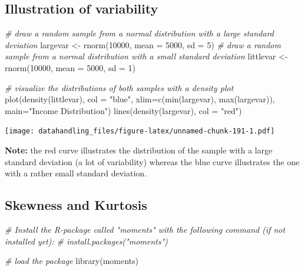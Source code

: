 \documentclass[
  12pt,
]{style/krantz}
\newenvironment{Shaded}{\begin{snugshade}}{\end{snugshade}}
\newcommand{\AttributeTok}[1]{\textcolor[rgb]{0.77,0.63,0.00}{#1}}
\newcommand{\CommentTok}[1]{\textcolor[rgb]{0.56,0.35,0.01}{\textit{#1}}}
\newcommand{\DecValTok}[1]{\textcolor[rgb]{0.00,0.00,0.81}{#1}}
\newcommand{\FunctionTok}[1]{\textcolor[rgb]{0.00,0.00,0.00}{#1}}
\newcommand{\NormalTok}[1]{#1}
\newcommand{\OtherTok}[1]{\textcolor[rgb]{0.56,0.35,0.01}{#1}}
\newcommand{\StringTok}[1]{\textcolor[rgb]{0.31,0.60,0.02}{#1}}
\begin{document}
\hypertarget{illustration-of-variability}{%
\subsection{Illustration of variability}\label{illustration-of-variability}}

\begin{Shaded}
\begin{Highlighting}[]
\CommentTok{\# draw a random sample from a normal distribution with a large standard deviation}
\NormalTok{largevar }\OtherTok{\textless{}{-}} \FunctionTok{rnorm}\NormalTok{(}\DecValTok{10000}\NormalTok{, }\AttributeTok{mean =} \DecValTok{5000}\NormalTok{, }\AttributeTok{sd =} \DecValTok{5}\NormalTok{)}
\CommentTok{\# draw a random sample from a normal distribution with a small standard deviation}
\NormalTok{littlevar }\OtherTok{\textless{}{-}} \FunctionTok{rnorm}\NormalTok{(}\DecValTok{10000}\NormalTok{, }\AttributeTok{mean =} \DecValTok{5000}\NormalTok{, }\AttributeTok{sd =} \DecValTok{1}\NormalTok{)}

\CommentTok{\# visualize the distributions of both samples with a density plot}
\FunctionTok{plot}\NormalTok{(}\FunctionTok{density}\NormalTok{(littlevar), }\AttributeTok{col =} \StringTok{"blue"}\NormalTok{, }
     \AttributeTok{xlim=}\FunctionTok{c}\NormalTok{(}\FunctionTok{min}\NormalTok{(largevar), }\FunctionTok{max}\NormalTok{(largevar)), }\AttributeTok{main=}\StringTok{"Income Distribution"}\NormalTok{)}
\FunctionTok{lines}\NormalTok{(}\FunctionTok{density}\NormalTok{(largevar), }\AttributeTok{col =} \StringTok{"red"}\NormalTok{)}
\end{Highlighting}
\end{Shaded}

\texttt{[image: datahandling\_files/figure-latex/unnamed-chunk-191-1.pdf]}

\textbf{Note:} the red curve illustrates the distribution of the sample with a large standard deviation (a lot of variability) whereas the blue curve illustrates the one with a rather small standard deviation.

\hypertarget{skewness-and-kurtosis}{%
\subsection{Skewness and Kurtosis}\label{skewness-and-kurtosis}}

\begin{Shaded}
\begin{Highlighting}[]
\CommentTok{\# Install the R{-}package called "moments" with the following command (if not installed yet):}
\CommentTok{\# install.packages("moments")}

\CommentTok{\# load the package}
\FunctionTok{library}\NormalTok{(moments)}
\end{Highlighting}
\end{Shaded}
\end{document}
